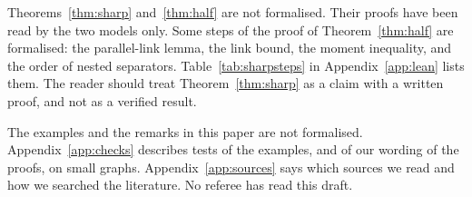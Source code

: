 Theorems~\ref{thm:sharp} and~\ref{thm:half} are not formalised. Their proofs have been read by the
two models only. Some steps of the proof of Theorem~\ref{thm:half} are formalised:
the parallel-link lemma, the link bound, the moment inequality, and the order of nested separators.
Table~\ref{tab:sharpsteps} in Appendix~\ref{app:lean} lists them. The reader should treat
Theorem~\ref{thm:sharp} as a claim with a written proof, and not as a verified result.

The examples and the remarks in this paper are not formalised. Appendix~\ref{app:checks} describes
tests of the examples, and of our wording of the proofs, on small graphs.
Appendix~\ref{app:sources} says which sources we read and how we searched the literature. No
referee has read this draft.
